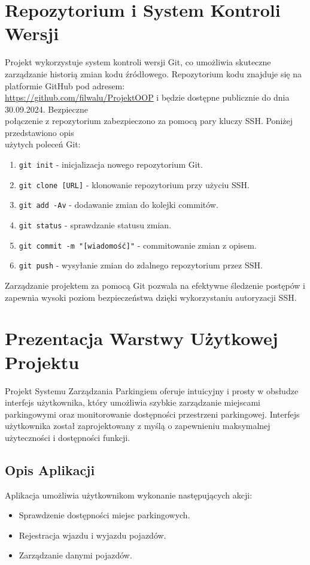 \documentclass{article}
\begin{document}
\section{Repozytorium i System Kontroli Wersji}

Projekt wykorzystuje system kontroli wersji Git, co umożliwia skuteczne zarządzanie historią zmian kodu źródłowego. Repozytorium kodu znajduje się na platformie GitHub pod adresem:\\ \url{https://github.com/filwalu/ProjektOOP} i będzie dostępne publicznie do dnia 30.09.2024. Bezpieczne\\ połączenie z repozytorium zabezpieczono za pomocą pary kluczy SSH. Poniżej przedstawiono opis\\ użytych poleceń Git:

\begin{enumerate}
    \item \texttt{git init} - inicjalizacja nowego repozytorium Git.
    \item \texttt{git clone [URL]} - klonowanie repozytorium przy użyciu SSH.
    \item \texttt{git add -Av} - dodawanie zmian do kolejki commitów.
    \item \texttt{git status} - sprawdzanie statusu zmian.
    \item \texttt{git commit -m "[wiadomość]"} - commitowanie zmian z opisem.
    \item \texttt{git push} - wysyłanie zmian do zdalnego repozytorium przez SSH.
\end{enumerate}

Zarządzanie projektem za pomocą Git pozwala na efektywne śledzenie postępów i zapewnia wysoki poziom bezpieczeństwa dzięki wykorzystaniu autoryzacji SSH.

\section{Prezentacja Warstwy Użytkowej Projektu}

Projekt Systemu Zarządzania Parkingiem oferuje intuicyjny i prosty w obsłudze interfejs użytkownika, który umożliwia szybkie zarządzanie miejscami parkingowymi oraz monitorowanie dostępności przestrzeni parkingowej. Interfejs użytkownika został zaprojektowany z myślą o zapewnieniu maksymalnej użyteczności i dostępności funkcji.

\subsection{Opis Aplikacji}
Aplikacja umożliwia użytkownikom wykonanie następujących akcji:
\begin{itemize}
    \item Sprawdzenie dostępności miejsc parkingowych.
    \item Rejestracja wjazdu i wyjazdu pojazdów.
    \item Zarządzanie danymi pojazdów.
    
\end{itemize}
\end{document}
